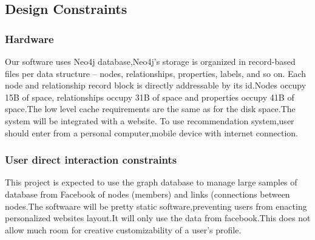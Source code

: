 \documentclass[11pt]{article}
\begin{document}
\subsection{Design Constraints}
\subsubsection{Hardware}
Our software uses Neo4j database,Neo4j’s storage is organized in record-based files per data structure – nodes, relationships, properties, labels, and so on. Each node and relationship record block is directly addressable by its id.Nodes occupy 15B
of space, relationships occupy 31B of space and properties occupy 41B of space.The low level cache requirements are the same as for the disk space.The
system  will  be  integrated  with  a  website.  To  use  recommendation  system,user 
should enter from a personal computer,mobile device with internet connection.

\subsubsection{User direct interaction constraints}
This project is expected to use the graph database to
manage large samples of database from Facebook of nodes (members) and links (connections
between nodes.The softwaare will be pretty static software,preventing users from enacting personalized websites layout.It will only use the data from facebook.This does not allow much room for creative customizability of a user's profile.
\end{document}
